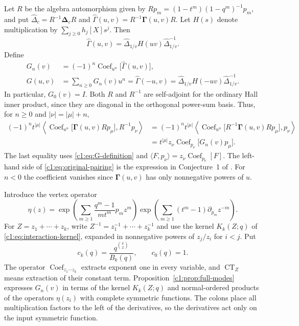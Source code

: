 \documentclass[12pt,reqno,a4paper]{amsart}
\numberwithin{equation}{section}
\numberwithin{figure}{section}
\theoremstyle{plain}
\theoremstyle{definition}
\DeclareMathOperator{\Coef}{Coef}
\begin{document}
Let $R$ be the algebra automorphism given by
$Rp_m=(1-t^m)(1-q^m)^{-1}p_m$, and put
$\widehat\Delta_c=R^{-1}\boldsymbol\Delta_cR$ and
$\widehat\Gamma(u,v)=R^{-1}\boldsymbol\Gamma(u,v)R$.
Let $H(s)$ denote multiplication by $\sum_{j\geq0}h_j[X]s^j$.
Then
\begin{equation}\label{c1:eq:gamma-conjugation}
 \widehat\Gamma(u,v)
 =\widehat\Delta_{1/v}H(uv)\widehat\Delta_{1/v}^{-1}.
\end{equation}
Define
\begin{equation}\label{c1:eq:G-definition}
 \begin{aligned}
 G_n(v)&=(-1)^n\Coef_{u^n}\bigl[\widehat\Gamma(u,v)\bigr],\\
 G(u,v)&=\sum_{n\geq0}G_n(v)u^n
 =\widehat\Gamma(-u,v)
 =\widehat\Delta_{1/v}H(-uv)
   \widehat\Delta_{1/v}^{-1}.
 \end{aligned}
\end{equation}
In particular, $G_0(v)=I$.
Both $R$ and $R^{-1}$ are self-adjoint for the ordinary Hall inner product,
since they are diagonal in the orthogonal power-sum basis.  Thus,
for $n\geq0$ and $|\nu|=|\mu|+n$,
\begin{equation}\label{c1:eq:original-pairing}
 \begin{aligned}
 (-1)^n t^{|\mu|}
 \left\langle \Coef_{u^n}\bigl[\boldsymbol\Gamma(u,v)Rp_\mu\bigr],
              R^{-1}p_\nu\right\rangle
 &=(-1)^n t^{|\mu|}
   \left\langle \Coef_{u^n}\bigl[R^{-1}\boldsymbol\Gamma(u,v)Rp_\mu\bigr],
                p_\nu\right\rangle\\
 &=t^{|\mu|}z_\nu\Coef_{p_\nu}\bigl[G_n(v)p_\mu\bigr].
 \end{aligned}
\end{equation}
The last equality uses \eqref{c1:eq:G-definition} and
$\langle F,p_\nu\rangle=z_\nu\Coef_{p_\nu}[F]$.
The left-hand side of \eqref{c1:eq:original-pairing}
is the expression in Conjecture~1 of \cite[Section~4.5]{BD26}.
For $n<0$ the coefficient vanishes since $\boldsymbol\Gamma(u,v)$ has
only nonnegative powers of $u$.

Introduce the vertex operator
\begin{equation}\label{c1:eq:eta-definition}
 \eta(z)=
 \exp\left(\sum_{m\geq1}\frac{q^m-1}{mt^m}p_mz^m\right)
 \exp\left(\sum_{m\geq1}(t^m-1)\partial_{p_m}z^{-m}\right).
\end{equation}
For $Z=z_1+\cdots+z_k$, write $Z^{-1}=z_1^{-1}+\cdots+z_k^{-1}$
and use the kernel $K_k(Z;q)$ of
\eqref{c1:eq:interaction-kernel}, expanded in nonnegative powers of
$z_j/z_i$ for $i<j$.  Put
\[
 c_k(q)=\frac{q^{\binom{k}{2}}}{B_k(q)},\qquad c_0(q)=1.
\]
The operator $\Coef_{z_1\cdots z_k}$ extracts exponent one in
every variable, and $\operatorname{CT}_Z$ means extraction of their
constant term.  Proposition~\ref{c1:prop:full-modes} expresses $G_n(v)$
in terms of the kernel $K_k(Z;q)$ and normal-ordered products of the
operators $\eta(z_i)$ with complete symmetric functions.  The colons
place all multiplication factors to the left of the derivatives, so the
derivatives act only on the input symmetric function.
\end{document}
